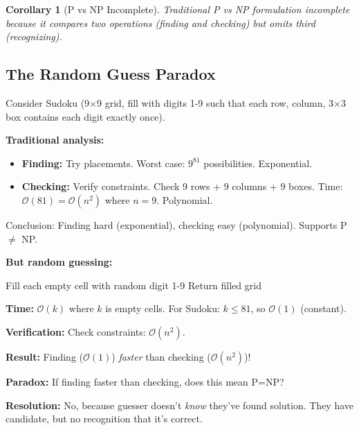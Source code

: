 \documentclass[twocolumn,10pt]{revtex4-2}
\newtheorem{corollary}[theorem]{Corollary}
\theoremstyle{definition}
\theoremstyle{remark}
\newcommand{\bigO}{\mathcal{O}}
\begin{document}
\begin{corollary}[P vs NP Incomplete]
\label{cor:pnp_incomplete}
Traditional P vs NP formulation incomplete because it compares two operations (finding and checking) but omits third (recognizing).
\end{corollary}

\subsection{The Random Guess Paradox}

Consider Sudoku (9$\times$9 grid, fill with digits 1-9 such that each row, column, 3$\times$3 box contains each digit exactly once).

\vspace{0.2cm}
\noindent\textbf{Traditional analysis:}
\begin{itemize}
\item \textbf{Finding:} Try placements. Worst case: $9^{81}$ possibilities. Exponential.
\item \textbf{Checking:} Verify constraints. Check 9 rows + 9 columns + 9 boxes. Time: $\bigO(81) = \bigO(n^2)$ where $n=9$. Polynomial.
\end{itemize}

Conclusion: Finding hard (exponential), checking easy (polynomial). Supports P $\neq$ NP.

\vspace{0.2cm}
\noindent\textbf{But random guessing:}

\begin{algorithm}
\caption{Random Guess}
\begin{algorithmic}[1]
\STATE Fill each empty cell with random digit 1-9
\STATE Return filled grid
\end{algorithmic}
\end{algorithm}

\textbf{Time:} $\bigO(k)$ where $k$ is empty cells. For Sudoku: $k \leq 81$, so $\bigO(1)$ (constant).

\textbf{Verification:} Check constraints: $\bigO(n^2)$.

\textbf{Result:} Finding ($\bigO(1)$) \textit{faster} than checking ($\bigO(n^2)$)!

\vspace{0.2cm}
\noindent\textbf{Paradox:} If finding faster than checking, does this mean P=NP?

\vspace{0.2cm}
\noindent\textbf{Resolution:} No, because guesser doesn't \textit{know} they've found solution. They have candidate, but no recognition that it's correct.
\end{document}
